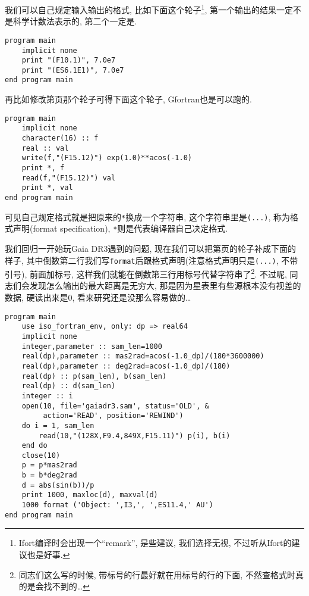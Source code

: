 我们可以自己规定输入输出的格式, 比如下面这个轮子\footnote{Ifort编译时会出现一个``remark'', 是些建议, 我们选择无视, 不过听从Ifort的建议也是好事.}, 第一个输出的结果一定不是科学计数法表示的, 第二个一定是. 
\begin{lstlisting}
program main
    implicit none
    print "(F10.1)", 7.0e7
    print "(ES6.1E1)", 7.0e7
end program main
\end{lstlisting}
再比如修改第\pageref{internal_file}页那个轮子可得下面这个轮子, Gfortran也是可以跑的.
\begin{lstlisting}
program main
    implicit none
    character(16) :: f
    real :: val
    write(f,"(F15.12)") exp(1.0)**acos(-1.0)
    print *, f
    read(f,"(F15.12)") val
    print *, val
end program main
\end{lstlisting}
可见自己规定格式就是把原来的\texttt{*}换成一个字符串, 这个字符串里是\texttt{(...)}, 称为格式声明(format specification), \texttt{*}则是代表编译器自己决定格式.

我们回归一开始玩Gaia DR3遇到的问题, 现在我们可以把第\pageref{gaiadr3.sam}页的轮子补成下面的样子, 其中倒数第二行我们写\texttt{format}后跟格式声明(注意格式声明只是\texttt{(...)}, 不带引号), 前面加标号, 这样我们就能在倒数第三行用标号代替字符串了\footnote{同志们这么写的时候, 带标号的行最好就在用标号的行的下面, 不然查格式时真的是会找不到的\dots}. 不过呢, 同志们会发现怎么输出的最大距离是无穷大, 那是因为星表里有些源根本没有视差的数据, 硬读出来是$0$, 看来研究还是没那么容易做的\dots
\begin{lstlisting}
program main
    use iso_fortran_env, only: dp => real64
    implicit none
    integer,parameter :: sam_len=1000
    real(dp),parameter :: mas2rad=acos(-1.0_dp)/(180*3600000)
    real(dp),parameter :: deg2rad=acos(-1.0_dp)/(180)
    real(dp) :: p(sam_len), b(sam_len)
    real(dp) :: d(sam_len)
    integer :: i
    open(10, file='gaiadr3.sam', status='OLD', &
         action='READ', position='REWIND')
    do i = 1, sam_len
        read(10,"(128X,F9.4,849X,F15.11)") p(i), b(i)
    end do
    close(10)
    p = p*mas2rad
    b = b*deg2rad
    d = abs(sin(b))/p
    print 1000, maxloc(d), maxval(d)
    1000 format ('Object: ',I3,', ',ES11.4,' AU')
end program main
\end{lstlisting}


